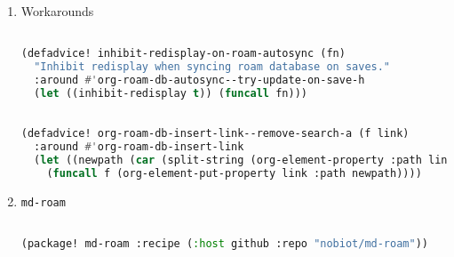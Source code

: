 \documentclass[11pt]{article}
\begin{document}
\begin{enumerate}
  
\begin{enumerate}
  \item Roam
  \label{sec:roam}

  \begin{lstlisting}[language=Lisp]%! Someone please complete this list for me

(after! org-roam
  (setq org-roam-capture-templates
        '(("d" "default" plain "%?"
           :target (file+head "%<%Y%m%d%H%M%S>.org" "#+title: ${title}
#+language: pt
")
           :unnarrowed t)
          ("m" "math" plain "%?"
           :target (file+head "math/%<%Y%m%d%H%M%S>.org" "#+title: ${title}
#+language: pt
")
           :unnarrowed t))))
          
\end{lstlisting}
  \item Roam-ref
  \label{sec:roam-ref}

  \begin{lstlisting}[language=Lisp]%! Someone please complete this list for me

(setq org-roam-capture-ref-templates
      '(("m" "math" plain "%?"
           :target (file+head "math/%<%Y%m%d%H%M%S>.org" "#+title: ${title}\n\n${body}")
           :unnarrowed t)
        ("fr" "Add to my future-read list" entry "* ${title}\n%?"
         :target (file+olp "to-read.org" ("${title}"))
         :empty-lines-before 1 nil nil)
        ("r" "ref" plain "%?" :target
         (file+head "${slug}.org" "#+title: ${title}")
         :unnarrowed t)))
\end{lstlisting}
\end{enumerate}

  \item Workarounds
  \label{sec:workarounds}

  \begin{lstlisting}[language=Lisp]%! Someone please complete this list for me

(defadvice! inhibit-redisplay-on-roam-autosync (fn)
  "Inhibit redisplay when syncing roam database on saves."
  :around #'org-roam-db-autosync--try-update-on-save-h
  (let ((inhibit-redisplay t)) (funcall fn)))
\end{lstlisting}

\begin{lstlisting}[language=Lisp]%! Someone please complete this list for me

(defadvice! org-roam-db-insert-link--remove-search-a (f link)
  :around #'org-roam-db-insert-link
  (let ((newpath (car (split-string (org-element-property :path link) "::"))))
    (funcall f (org-element-put-property link :path newpath))))
\end{lstlisting}
  \item \texttt{md-roam}
  \label{sec:md-roam}

  \begin{lstlisting}[language=Lisp]%! Someone please complete this list for me

(package! md-roam :recipe (:host github :repo "nobiot/md-roam"))
\end{lstlisting}
\end{enumerate}
\end{document}
